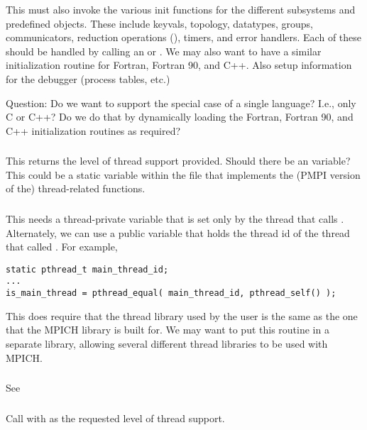 \documentclass{article}
\begin{document}
This must also invoke the various init functions for the different
subsystems and predefined objects.  These include keyvals, topology, datatypes,
groups, communicators, reduction operations (), timers, and error
handlers.  Each of these should be handled by calling an
 or .  We may also
want to have a similar initialization routine for Fortran, Fortran 90,
and C++.  
Also setup information for the debugger (process tables, etc.)

Question: Do we want to support the special case of a single language?  I.e.,
only C or C++?  Do we do that by dynamically loading the Fortran, Fortran 90,
and C++ initialization routines as required?

\subsubsection{}
This returns the level of thread support provided.  Should there be an
 variable?  This could be a static
variable within the file that implements the (PMPI version of the)
thread-related functions. 

\subsubsection{}
This needs a thread-private variable that is set only by the thread that calls
.  Alternately, we can use a public variable that
holds the thread id of the thread that called .  For
example, 
\begin{verbatim}
static pthread_t main_thread_id;
...
is_main_thread = pthread_equal( main_thread_id, pthread_self() );
\end{verbatim}
This does require that the thread library used by the user is the same as the
one that the MPICH library is built for.  We may want to put this routine in a
separate library, allowing several different thread libraries to be used with
MPICH. 

\subsubsection{}
See 

\subsubsection{}
Call  with  as the
requested level of thread support.
\end{document}
